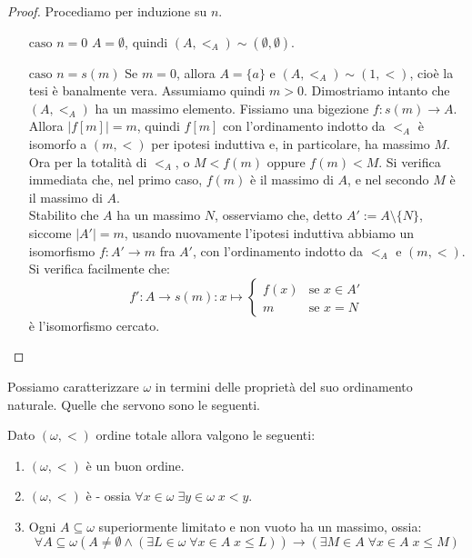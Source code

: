\documentclass[11pt]{scrartcl}
\begin{document}
\begin{proof}
	Procediamo per induzione su $n$.
	\begin{itemize}
		\item[$\boxed{\text{caso $n = 0$}}$] $A = \emptyset$, quindi $(A,<_A) \sim (\emptyset,\emptyset)$.
		\item[$\boxed{\text{caso $n = s(m)$}}$] Se $m = 0$, allora $A = \{a\}$ e $(A,<_A) \sim (1,<)$, cioè la tesi è banalmente vera. Assumiamo quindi $m>0$. Dimostriamo intanto che $(A,<_A)$ ha un massimo elemento.
		Fissiamo una bigezione $f : s(m) \rightarrow A$. Allora $|f[m]| = m$, quindi $f[m]$ con l'ordinamento indotto da $<_A$ è isomorfo a $(m,<)$ per ipotesi induttiva e, in particolare, ha massimo $M$. Ora per la totalità di $<_A$,
		o $M < f(m)$ oppure $f(m)<M$. Si verifica immediata che, nel primo caso, $f(m)$ è il massimo di $A$, e nel secondo $M$ è il massimo di $A$.\\
		Stabilito che $A$ ha un massimo $N$, osserviamo che, detto $A' := A \setminus\{N\}$, siccome $|A'| = m$, usando nuovamente l'ipotesi induttiva abbiamo un isomorfismo $f : A' \rightarrow m$ fra $A'$, con l'ordinamento indotto da $<_A$ e $(m,<)$.
		Si verifica facilmente che:
		\[ f' : A \longrightarrow s(m) : x \longmapsto \begin{cases}
			f(x) &\text{se $x \in A'$} \\
			m &\text{se $x = N$}
		\end{cases}
			\]
		è l'isomorfismo cercato.
	\end{itemize}
\end{proof}

Possiamo caratterizzare $\omega$ in termini delle proprietà del suo ordinamento naturale. Quelle che servono sono le seguenti.

\begin{proposition}
	Dato $(\omega,<)$ ordine totale allora valgono le seguenti:
	\begin{enumerate}[(1)]
		\item $(\omega,<)$ è un buon ordine.
		\item $(\omega,<)$ è  - ossia $\forall x \in \omega \; \exists y \in \omega \; x < y$.
		\item Ogni $A \subseteq \omega$ superiormente limitato e non vuoto ha un massimo, ossia:
		\[ \forall A \subseteq \omega (A \ne \emptyset \land (\exists L \in \omega \; \forall x \in A \; x \leq L)) \longrightarrow (\exists M \in A \; \forall x \in A \; x \leq M)
			\]
	\end{enumerate}
\end{proposition}
\end{document}
